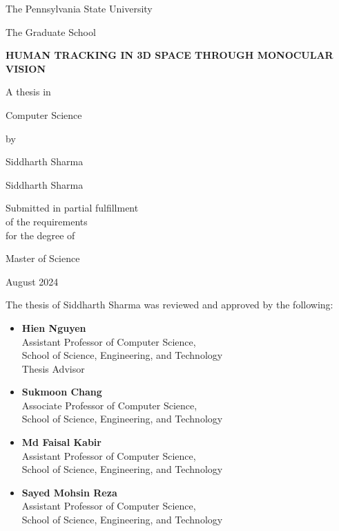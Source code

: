 \documentclass[12pt]{report}
\begin{document}
\doublespacing

\begin{titlepage}
    \centering
    The Pennsylvania State University\par
    The Graduate School\par
    \vspace*{1in}
    \textbf{HUMAN TRACKING IN 3D SPACE THROUGH MONOCULAR VISION}\par
    \vspace{1.5in}
    A thesis in\par
    Computer Science\par
    by\par
    Siddharth Sharma\par
    \vfill
    \textcopyright Siddharth Sharma\par
    \vfill
    Submitted in partial fulfillment\\of the requirements\\for the degree of \par
    \vspace{0.5in}
    Master of Science\par
    \vspace{0.5in}
    August 2024\par
\end{titlepage}

\newpage
\begin{justify}
The thesis of Siddharth Sharma was reviewed and approved by the following:
\end{justify}

\begin{itemize}
    \item \textbf{Hien Nguyen}\\
    Assistant Professor of Computer Science,\\
    School of Science, Engineering, and Technology\\
    Thesis Advisor
    
    \item \textbf{Sukmoon Chang}\\
    Associate Professor of Computer Science,\\
    School of Science, Engineering, and Technology
    
    \item \textbf{Md Faisal Kabir}\\
    Assistant Professor of Computer Science,\\
    School of Science, Engineering, and Technology
    
    \item \textbf{Sayed Mohsin Reza}\\
    Assistant Professor of Computer Science,\\
    School of Science, Engineering, and Technology
\end{itemize}
\end{document}
